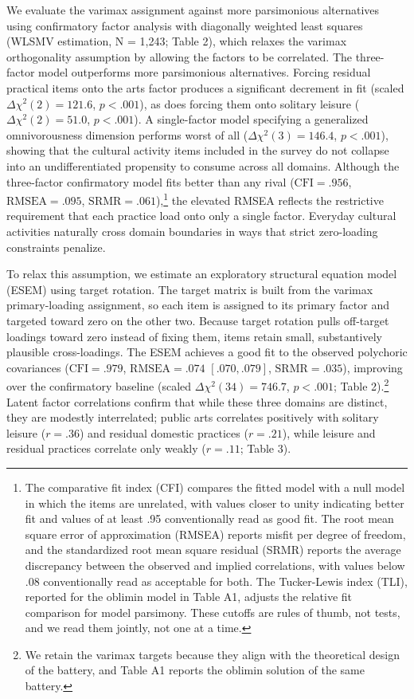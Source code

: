 \documentclass[
  12pt
]{article}
\begin{document}
We evaluate the varimax assignment against more parsimonious alternatives using confirmatory factor analysis with diagonally weighted least squares (WLSMV estimation, N = 1,243; Table 2), which relaxes the varimax orthogonality assumption by allowing the factors to be correlated. The three-factor model outperforms more parsimonious alternatives. Forcing residual practical items onto the arts factor produces a significant decrement in fit (scaled $\Delta\chi^2(2) = 121.6$, $p < .001$), as does forcing them onto solitary leisure ($\Delta\chi^2(2) = 51.0$, $p < .001$). A single-factor model specifying a generalized omnivorousness dimension performs worst of all ($\Delta\chi^2(3) = 146.4$, $p < .001$), showing that the cultural activity items included in the survey do not collapse into an undifferentiated propensity to consume across all domains. Although the three-factor confirmatory model fits better than any rival ($\text{CFI} = .956$, $\text{RMSEA} = .095$, $\text{SRMR} = .061$),\footnote{The comparative fit index (CFI) compares the fitted model with a null model in which the items are unrelated, with values closer to unity indicating better fit and values of at least .95 conventionally read as good fit. The root mean square error of approximation (RMSEA) reports misfit per degree of freedom, and the standardized root mean square residual (SRMR) reports the average discrepancy between the observed and implied correlations, with values below .08 conventionally read as acceptable for both. The Tucker-Lewis index (TLI), reported for the oblimin model in Table A1, adjusts the relative fit comparison for model parsimony. These cutoffs are rules of thumb, not tests, and we read them jointly, not one at a time.} the elevated RMSEA reflects the restrictive requirement that each practice load onto only a single factor. Everyday cultural activities naturally cross domain boundaries in ways that strict zero-loading constraints penalize.

To relax this assumption, we estimate an exploratory structural equation model (ESEM) using target rotation. The target matrix is built from the varimax primary-loading assignment, so each item is assigned to its primary factor and targeted toward zero on the other two. Because target rotation pulls off-target loadings toward zero instead of fixing them, items retain small, substantively plausible cross-loadings. The ESEM achieves a good fit to the observed polychoric covariances ($\text{CFI} = .979$, $\text{RMSEA} = .074$ $[.070, .079]$, $\text{SRMR} = .035$), improving over the confirmatory baseline (scaled $\Delta\chi^2(34) = 746.7$, $p < .001$; Table 2).\footnote{We retain the varimax targets because they align with the theoretical design of the battery, and Table A1 reports the oblimin solution of the same battery.}  Latent factor correlations confirm that while these three domains are distinct, they are modestly interrelated; public arts correlates positively with solitary leisure ($r = .36$) and residual domestic practices ($r = .21$), while leisure and residual practices correlate only weakly ($r = .11$; Table 3). 
\end{document}
